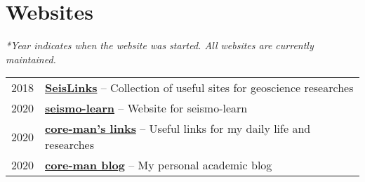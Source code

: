 \section*{Websites}

\textit{*Year indicates when the website was started. All websites are currently maintained.}

\begin{tabular}{p{} p{}}
2018 &	\textbf{\href{https://link.seisman.info/}{SeisLinks}} -- Collection of useful sites for geoscience researches \\
2020 &	\textbf{\href{https://seismo-learn.org/}{seismo-learn}} -- Website for seismo-learn \\
2020 &	\textbf{\href{https://core-man.github.io/link/}{core-man's links}} -- Useful links for my daily life and researches \\
2020 &	\textbf{\href{https://core-man.github.io/blog/}{core-man blog}} -- My personal academic blog \\
\end{tabular}
